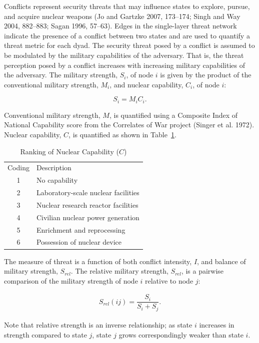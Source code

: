 \documentclass{article} %
\begin{document}
{Conflicts represent security threats that may influence states to explore, pursue, and acquire nuclear weapons (Jo and Gartzke 2007, 173--174; Singh and Way 2004, 882--883; Sagan 1996, 57--63). Edges in the single-layer threat network indicate the presence of a conflict between two states and are used to quantify a threat metric for each dyad. The security threat posed by a conflict is assumed to be modulated by the military capabilities of the adversary. That is, the threat perception posed by a conflict increases with increasing military capabilities of the adversary. The military strength, $S_i$, of node $i$ is given by the product of the conventional military strength, $M_i$, and nuclear capability, $C_i$, of node $i$:
\begin{center}
\begin{equation}
S_i = M_i C_i.
\end{equation}
\end{center}
Conventional military strength, $M$, is quantified using a Composite Index of National Capability score from the Correlates of War project (Singer et al. 1972). Nuclear capability, $C$, is quantified as shown in Table~\ref{tab:cap}. 

\begin{table}
\centering
\caption{Ranking of Nuclear Capability ($C$)
\label{tab:cap}}
\begin{tabular}{c@{\hskip 0.35in}l}
\hline\noalign{\smallskip}
Coding & Description\\
\noalign{\smallskip}
\hline
\noalign{\smallskip}
1 & No capability \\
2 & Laboratory-scale nuclear facilities \\
3 & Nuclear research reactor facilities \\
4 & Civilian nuclear power generation \\
5 & Enrichment and reprocessing \\
6 & Possession of nuclear device \\
\hline
\end{tabular} 
\end{table}

The measure of threat is a function of both conflict intensity, $I$, and balance of military strength, $S_{rel}$. The relative military strength, $S_{rel}$, is a pairwise comparison of the military strength of node $i$ relative to node $j$:
\begin{center}
\begin{equation}
\begin{aligned}
S_{rel}(ij) = \dfrac {S_i} {S_i + S_j}.
\end{aligned}
\end{equation}
\end{center}
Note that relative strength is an inverse relationship; as state $i$ increases in strength compared to state $j$, state $j$ grows correspondingly weaker than state $i$.

}
\end{document}
